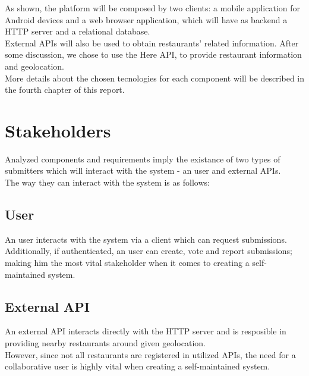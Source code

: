 As shown, the platform will be composed by two clients: a mobile application for Android devices and a web browser
application, which will have as backend a HTTP server and a relational database.\\

External APIs will also be used to obtain restaurants' related information. After some discussion, we chose
to use the Here API, to provide restaurant information and geolocation.\\

More details about the chosen tecnologies for each component will be described in the fourth chapter of this report.\\

\section{Stakeholders}

Analyzed components and requirements imply the existance of two types of submitters which will interact with the system - an user and external APIs.\\

The way they can interact with the system is as follows:\\

\subsection{User}

An user interacts with the system via a client which can request submissions.
Additionally, if authenticated, an user can create, vote and report submissions; making him the most vital stakeholder when it comes to creating a self-maintained system.

\subsection{External API}

An external API interacts directly with the HTTP server and is resposible in providing nearby restaurants around given geolocation.\\

However, since not all restaurants are registered in utilized APIs, the need for a collaborative user is highly vital when creating a self-maintained system.\\